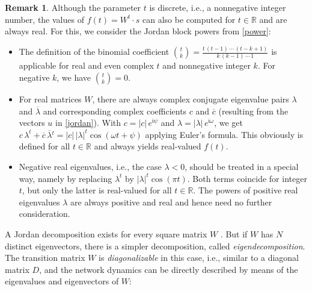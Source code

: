 \documentclass[twoside,11pt]{article}
\theoremstyle{definition}
\newtheorem{remk}{Remark}
\begin{document}
\begin{remk}\label{general}
Although the parameter $t$ is discrete, i.e., a nonnegative integer number, the
values of $f(t) = W^t \cdot s$ can also be computed for $t \in \mathbb{R}$ and
are always real. For this, we consider the Jordan block powers from \cref{power}:
\begin{itemize}
  \item The definition of the binomial coefficient $\binom{t}{k} =
	\frac{t\,(t-1)\,\cdots\,(t-k+1)}{k\,(k-1)\,\cdots\,1}$ is applicable for
	real and even complex $t$ and nonnegative integer $k$. For negative $k$,
	we have $\binom{t}{k} = 0$.
  \item For real matrices $W$, there are always complex conjugate eigenvalue
	pairs $\lambda$ and $\overline{\lambda}$ and corresponding complex
	coefficients $c$ and $\overline{c}$ (resulting from the vectors $u$ in
	\cref{jordan}). With $c = |c|\,e^{\mathfrak{i}\psi}$ and
	$\lambda = |\lambda|\,e^{\mathfrak{i}\omega}$, we get $c\,\lambda^t +
	\overline{c}\,\overline{\lambda}{}^t = |c|\,|\lambda|^t \cos(\omega
	t+\psi)$ applying Euler's formula. This obviously is defined for all
	$t \in \mathbb{R}$ and always yields real-valued $f(t)$.
  \item Negative real eigenvalues, i.e., the case $\lambda<0$, should be treated
	in a special way, namely by replacing $\lambda^t$ by $|\lambda|^t \cos(\pi t)$.
	Both terms coincide for integer $t$, but only the latter is real-valued
	for all $t \in \mathbb{R}$. The powers of positive real eigenvalues
	$\lambda$ are always positive and real and hence need no further consideration.
\end{itemize}
\end{remk}

A Jordan decomposition exists for every square matrix $W$ \citep[Theorem~3.1.11]{HJ13}.
But if $W$ has $N$ distinct eigenvectors, there is a simpler decomposition,
called \emph{eigendecomposition}. The transition matrix $W$ is
\emph{diagonalizable} in this case, i.e., similar to a diagonal matrix $D$, and
the network dynamics can be directly described by means of the eigenvalues and
eigenvectors of $W$:
\end{document}
